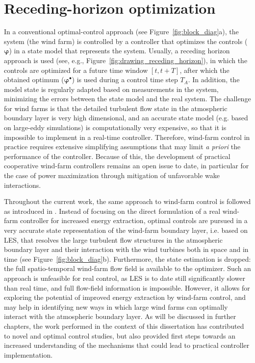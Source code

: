 \section{Receding-horizon optimization}\label{sec:problem_receding}
In a conventional optimal-control approach (see Figure~\ref{fig:block_diag}a), the system (the wind farm) is controlled by a controller that optimizes the controls ($\boldsymbol{\varphi}$) in a state model that represents the system. Usually, a receding horizon approach is used (see, e.g., Figure~\ref{fig:drawing_receding_horizon}), in which the controls are optimized for a future time window $[t,t+T]$, after which the obtained optimum ($\boldsymbol{\varphi}^{\bullet}$) is used during a control time step $T_A$. In addition, the model state is regularly adapted based on measurements in the system, minimizing the errors between the state model and the real system. The challenge for wind farms is that the detailed turbulent flow state in the atmospheric boundary layer is very high dimensional, and an accurate state model (e.g. based on large-eddy simulations) is computationally very expensive, so that it is impossible to implement in a real-time controller. Therefore, wind-farm control in practice requires extensive simplifying assumptions that may limit \emph{a priori} the performance of the controller. Because of this, the development of practical cooperative wind-farm controllers remains an open issue to date, in particular for the case of power maximization through mitigation of unfavorable wake interactions.

Throughout the current work, the same approach to wind-farm control is followed as introduced in \cite{goit2015optimal}. Instead of focusing on the direct formulation of a real wind-farm controller for increased energy extraction, optimal controls are pursued in a very accurate state representation of the wind-farm boundary layer, i.e. based on LES, that resolves the large turbulent flow structures in the atmospheric boundary layer and their interaction with the wind turbines both in space and in time (see Figure~\ref{fig:block_diag}b). Furthermore, the state estimation is dropped: the full spatio-temporal wind-farm flow field is available to the optimizer. Such an approach is unfeasible for real control, as LES is to date still significantly slower than real time, and full flow-field information is impossible. However, it allows for exploring the potential of improved energy extraction by wind-farm control, and may help in identifying new ways in which large wind farms can optimally interact with the atmospheric boundary layer. As will be discussed in further chapters, the work performed in the context of this dissertation has contributed to novel and optimal control studies, but also provided first steps towards an increased understanding of the mechanisms that could lead to practical controller implementation.

